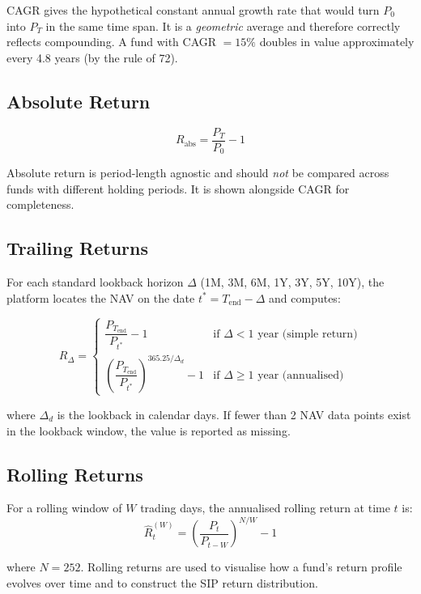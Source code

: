 \documentclass[12pt, a4paper]{article}
\begin{document}
\begin{interpretation}[CAGR]
CAGR gives the hypothetical constant annual growth rate that would turn
$P_0$ into $P_T$ in the same time span.  It is a \emph{geometric} average
and therefore correctly reflects compounding.  A fund with CAGR $= 15\%$
doubles in value approximately every 4.8 years (by the rule of 72).
\end{interpretation}

\subsection{Absolute Return}

\[
  R_{\text{abs}} = \frac{P_T}{P_0} - 1
\]

Absolute return is period-length agnostic and should \emph{not} be compared
across funds with different holding periods.  It is shown alongside CAGR
for completeness.

\subsection{Trailing Returns}

For each standard lookback horizon $\Delta$ (1M, 3M, 6M, 1Y, 3Y, 5Y,
10Y), the platform locates the NAV on the date
$t^* = T_{\text{end}} - \Delta$ and computes:

\[
  R_\Delta =
  \begin{cases}
    \dfrac{P_{T_{\text{end}}}}{P_{t^*}} - 1
    & \text{if } \Delta < 1\text{ year (simple return)} \\[1em]
    \left(\dfrac{P_{T_{\text{end}}}}{P_{t^*}}\right)^{365.25/\Delta_d} - 1
    & \text{if } \Delta \geq 1\text{ year (annualised)}
  \end{cases}
\]

where $\Delta_d$ is the lookback in calendar days.  If fewer than 2 NAV
data points exist in the lookback window, the value is reported as missing.

\subsection{Rolling Returns}

For a rolling window of $W$ trading days, the annualised rolling return
at time $t$ is:
\[
  \hat{R}_t^{(W)} = \left(\frac{P_t}{P_{t-W}}\right)^{N/W} - 1
\]

where $N = 252$.  Rolling returns are used to visualise how a fund's return
profile evolves over time and to construct the SIP return distribution.
\end{document}
